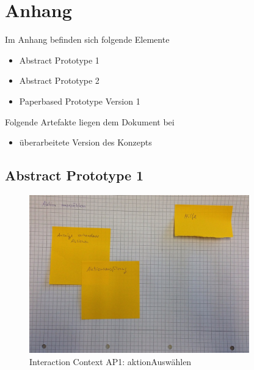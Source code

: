 

\chapter*{Anhang}
Im Anhang befinden sich folgende Elemente
\begin{itemize}
   \item
   Abstract Prototype 1

   \item
   Abstract Prototype 2

   \item
   Paperbased Prototype Version 1

\end{itemize}

\vspace{1cm}
Folgende Artefakte liegen dem Dokument bei
\begin{itemize}
   \item überarbeitete Version des Konzepts
\end{itemize}


\newpage
{}
\section*{Abstract Prototype 1}

\begin{figure}[H]
\centering
\includegraphics[width=0.85\textwidth]{./images/abstract/version1/aktionAuswaehlen.JPG}
\caption{Interaction Context AP1: aktionAuswählen}
\label{interfaceContents20}
\end{figure}

